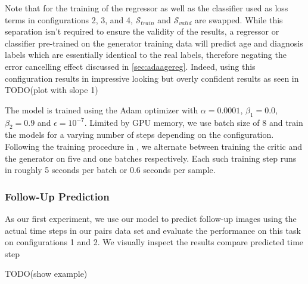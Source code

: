 Note that for the training of the regressor as well as the classifier used as loss terms in configurations 2, 3, and 4, $\mathcal{S}_{train}$ and $\mathcal{S}_{valid}$ are swapped. While this separation isn't required to ensure the validity of the results, a regressor or classifier pre-trained on the generator training data will predict age and diagnosis labels which are essentially identical to the real labels, therefore negating the error cancelling effect discussed in \autoref{sec:adaagereg}. Indeed, using this configuration results in impressive looking but overly confident results as seen in TODO(plot with slope 1)

The model is trained using the Adam optimizer with $\alpha = 0.0001$, $\beta_1 = 0.0$, $\beta_2 = 0.9$ and $\epsilon = 10^{-7}$. Limited by GPU memory, we use batch size of 8 and train the models for a varying number of steps depending on the configuration. Following the training procedure in \cite{goodfellow2014generative}, we alternate between training the critic and the generator on five and one batches respectively. Each such training step runs in roughly 5 seconds per batch or 0.6 seconds per sample.

\subsubsection*{Follow-Up Prediction}
As our first experiment, we use our model to predict follow-up images using the actual time steps in our pairs data set and evaluate the performance on this task on configurations 1 and 2.
We visually inspect the results
compare predicted time step

TODO(show example)

